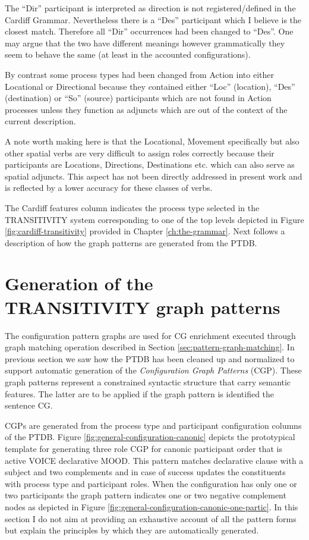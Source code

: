 The ``Dir'' participant is interpreted as direction is not registered/defined in the Cardiff Grammar. Nevertheless there is a ``Des'' participant which I believe is the closest match. Therefore all ``Dir'' occurrences had been changed to ``Des''. One may argue that the two have different meanings however grammatically they seem to behave the same (at least in the accounted configurations). 

By contrast some process types had been changed from Action into either Locational or Directional because they contained either ``Loc'' (location), ``Des'' (destination) or ``So'' (source) participants which are not found in Action processes unless they function as adjuncts which are out of the context of the current description.

A note worth making here is that the Locational, Movement specifically but also other spatial verbs are very difficult to assign roles correctly because their participants are Locations, Directions, Destinations etc. which can also serve as spatial adjuncts. This aspect has not been directly addressed in present work and is reflected by a lower accuracy for these classes of verbs. 

The Cardiff features column indicates the process type selected in the TRANSITIVITY system corresponding to one of the top levels depicted in Figure \ref{fig:cardiff-transitivity} provided in Chapter \ref{ch:the-grammar}. Next follows a description of how the graph patterns are generated from the PTDB. 

\section{Generation of the TRANSITIVITY graph patterns}
\label{sec:gen-sem}
The configuration pattern graphs are used for CG enrichment executed through graph matching operation described in Section \ref{sec:pattern-graph-matching}. In previous section we saw how the PTDB has been cleaned up and normalized to support automatic generation of the \textit{Configuration Graph Patterns} (CGP). These graph patterns represent a constrained syntactic structure that carry semantic features. The latter are to be applied if the graph pattern is identified the sentence CG. 

CGPs are generated from the process type and participant configuration columns of the PTDB. Figure \ref{fig:general-configuration-canonic} depicts the prototypical template for generating three role CGP for canonic participant order that is active VOICE declarative MOOD. This pattern matches declarative clause with a subject and two complements and in case of success updates the constituents with process type and participant roles. When the configuration has only one or two participants the graph pattern indicates one or two negative complement nodes as depicted in Figure \ref{fig:general-configuration-canonic-one-partic}. In this section I do not aim at providing an exhaustive account of all the pattern forms but explain the principles by which they are automatically generated.

